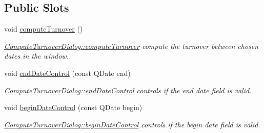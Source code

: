 \subsection*{Public Slots}
\begin{DoxyCompactItemize}
\item 
\hypertarget{classGui_1_1Dialogs_1_1ComputeTurnoverDialog_ab4d2a48bffed8c09e3d16e2849fd4b0e}{void \hyperlink{classGui_1_1Dialogs_1_1ComputeTurnoverDialog_ab4d2a48bffed8c09e3d16e2849fd4b0e}{compute\-Turnover} ()}\label{classGui_1_1Dialogs_1_1ComputeTurnoverDialog_ab4d2a48bffed8c09e3d16e2849fd4b0e}

\begin{DoxyCompactList}\small\item\em \hyperlink{classGui_1_1Dialogs_1_1ComputeTurnoverDialog_ab4d2a48bffed8c09e3d16e2849fd4b0e}{Compute\-Turnover\-Dialog\-::compute\-Turnover} compute the turnover between chosen dates in the window. \end{DoxyCompactList}\item 
void \hyperlink{classGui_1_1Dialogs_1_1ComputeTurnoverDialog_adaa4564ae195b0bf3c7e9ae5058b2603}{end\-Date\-Control} (const Q\-Date end)
\begin{DoxyCompactList}\small\item\em \hyperlink{classGui_1_1Dialogs_1_1ComputeTurnoverDialog_adaa4564ae195b0bf3c7e9ae5058b2603}{Compute\-Turnover\-Dialog\-::end\-Date\-Control} controls if the {\itshape end} date field is valid. \end{DoxyCompactList}\item 
void \hyperlink{classGui_1_1Dialogs_1_1ComputeTurnoverDialog_a0ded716ae88bbd69363e24940eb48d3a}{begin\-Date\-Control} (const Q\-Date begin)
\begin{DoxyCompactList}\small\item\em \hyperlink{classGui_1_1Dialogs_1_1ComputeTurnoverDialog_a0ded716ae88bbd69363e24940eb48d3a}{Compute\-Turnover\-Dialog\-::begin\-Date\-Control} controls if the {\itshape begin} date field is valid. \end{DoxyCompactList}\end{DoxyCompactItemize}
